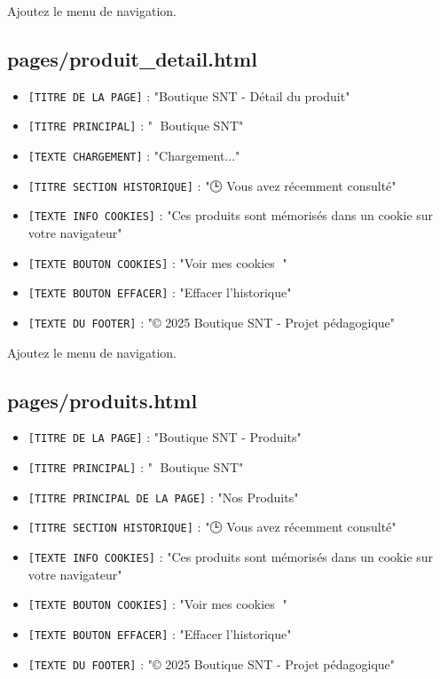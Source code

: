 \documentclass[12pt,a4paper]{article}
\begin{document}
Ajoutez le menu de navigation.

\subsection{pages/produit\_detail.html}

\begin{itemize}
\item \texttt{[TITRE DE LA PAGE]} : "Boutique SNT - Détail du produit"
\item \texttt{[TITRE PRINCIPAL]} : "🛒 Boutique SNT"
\item \texttt{[TEXTE CHARGEMENT]} : "Chargement..."
\item \texttt{[TITRE SECTION HISTORIQUE]} : "🕒 Vous avez récemment consulté"
\item \texttt{[TEXTE INFO COOKIES]} : "Ces produits sont mémorisés dans un cookie sur votre navigateur"
\item \texttt{[TEXTE BOUTON COOKIES]} : "Voir mes cookies 🍪"
\item \texttt{[TEXTE BOUTON EFFACER]} : "Effacer l'historique"
\item \texttt{[TEXTE DU FOOTER]} : "© 2025 Boutique SNT - Projet pédagogique"
\end{itemize}

Ajoutez le menu de navigation.

\subsection{pages/produits.html}

\begin{itemize}
\item \texttt{[TITRE DE LA PAGE]} : "Boutique SNT - Produits"
\item \texttt{[TITRE PRINCIPAL]} : "🛒 Boutique SNT"
\item \texttt{[TITRE PRINCIPAL DE LA PAGE]} : "Nos Produits"
\item \texttt{[TITRE SECTION HISTORIQUE]} : "🕒 Vous avez récemment consulté"
\item \texttt{[TEXTE INFO COOKIES]} : "Ces produits sont mémorisés dans un cookie sur votre navigateur"
\item \texttt{[TEXTE BOUTON COOKIES]} : "Voir mes cookies 🍪"
\item \texttt{[TEXTE BOUTON EFFACER]} : "Effacer l'historique"
\item \texttt{[TEXTE DU FOOTER]} : "© 2025 Boutique SNT - Projet pédagogique"
\end{itemize}
\end{document}
